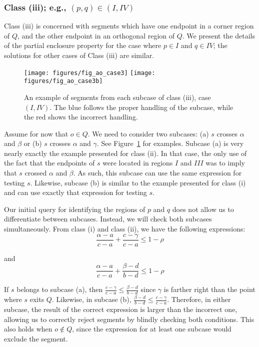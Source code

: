 \subsubsection{Class (iii); e.g., $(p, q) \in (I, IV)$}
\label{:rectanges:ao:class3}

Class (iii) is concerned with segments which have one endpoint in a corner region of $Q$, and the other endpoint in an orthogonal region of $Q$. 
We present the details of the partial enclosure property for the case where $p \in I$ and $q \in IV$; the solutions for other cases of Class (iii) are similar.

\begin{figure}[t]
\begin{center}
  \texttt{[image: figures/fig\_ao\_case3]}
  \hspace{1.0em}
  \texttt{[image: figures/fig\_ao\_case3b]}
  \caption[An example of a segment in class (iii), case $(I, IV)$.]{An example of segments from each subcase of class (iii), case $(I, IV)$. The blue follows the proper handling of the subcase, while the red shows the incorrect handling.}
  \label{fig:rectangles:ao:case3}
\end{center}
\end{figure}

Assume for now that $o \in Q$. We need to consider two subcases: (a) $s$ crosses $\alpha$ and $\beta$ or (b) $s$ crosses $\alpha$ and $\gamma$. See Figure~\ref{fig:rectangles:ao:case3} for examples. Subcase (a) is very nearly exactly the example presented for class (ii). In that case, the only use of the fact that the endpoints of $s$ were located in regions $I$ and $III$ was to imply that $s$ crossed $\alpha$ and $\beta$. As such, this subcase can use the same expression for testing $s$. Likewise, subcase (b) is similar to the example presented for class (i) and can use exactly that expression for testing $s$.

Our initial query for identifying the regions of $p$ and $q$ does not allow us to differentiate between subcases.
Instead, we will check both subcases simultaneously.
From class (i) and class (ii), we have the following expressions:
\[ 
\frac{\alpha - a}{c - a} + \frac{c - \gamma}{c - a} \leq 1 - \rho
\]

\noindent and
\[ 
\frac{\alpha - a}{c - a} + \frac{\beta - d}{b - d} \leq 1 - \rho
\]

\noindent If $s$ belongs to subcase (a), then $\frac{c - \gamma}{c - a} \leq \frac{\beta - d}{b - d}$ since $\gamma$ is farther right than the point where $s$ exits $Q$.
Likewise, in subcase (b), $\frac{\beta - d}{b - d} \leq \frac{c - \gamma}{c - a}$.
Therefore, in either subcase, the result of the correct expression is larger than the incorrect one, allowing us to correctly reject segments by blindly checking both conditions.
This also holds when $o \not \in Q$, since the expression for at least one subcase would exclude the segment.


